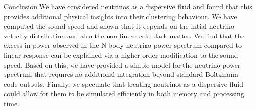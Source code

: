 \begin{section}{Conclusion}
  \label{sec:conclusion}
  We have considered neutrinos as a dispersive fluid and found that
  this provides additional physical insights into their clustering
  behaviour.  We have computed the sound speed and shown that it
  depends on the intial neutrino velocity distribution and also the
  non-linear cold dark matter.  We find that the excess in power
  observed in the N-body neutrino power spectrum compared to linear
  response can be explained via a higher-order modification to the
  sound speed.  Based on this, we have provided a simple model for the
  neutrino power spectrum that requires no additional integration
  beyond standard Boltzmann code outputs.  Finally, we speculate that
  treating neutrinos as a dispersive fluid could allow for them to be
  simulated efficiently in both memory and processing time.
\end{section}